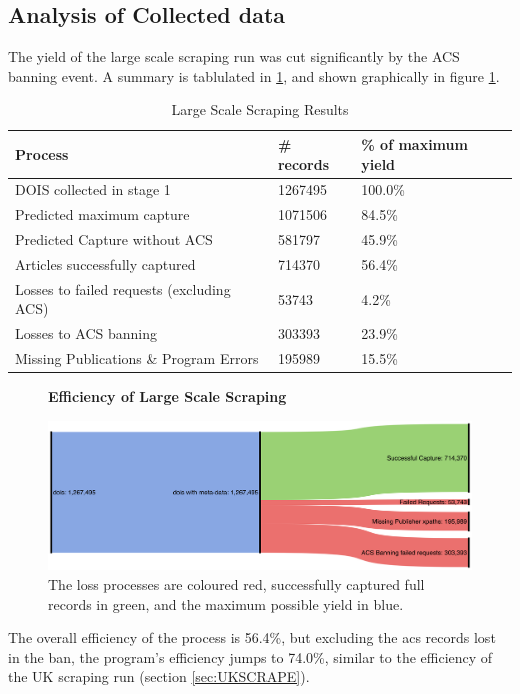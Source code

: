 \subsection{Analysis of Collected data}
The yield of the large scale scraping run was cut significantly by the ACS banning event. A summary is tablulated in \ref{tab:LARGESCRAPERES}, and shown graphically in figure \ref{fig:LARGESANK}.
\begin{table}[h!]
\label{tab:LARGESCRAPERES}
\caption{Large Scale Scraping Results}
\begin{center}
\begin{tabular}{||l|l|l||}
\hline
Process & \# records & \% of maximum yield\\
\hline
DOIS collected in stage 1 &  1267495 &100.0\%\\
\hline
Predicted maximum capture & 1071506 &  84.5\%\\
Predicted Capture without ACS & 581797 & 45.9\%\\
\hline
Articles successfully captured & 714370 & 56.4\%\\
Losses to failed requests (excluding ACS)& 53743 & 4.2\%\\
Losses to ACS banning & 303393 & 23.9\%\\
Missing Publications \& Program Errors & 195989 & 15.5\%\\
\hline
\end{tabular}
\end{center}
\end{table}
\begin{figure}[H]
    \centering
    \textbf{Efficiency of Large Scale Scraping}\par\medskip
    \includegraphics[width=\textwidth]{Data_Acquisition/large_sankey.png}
    \caption{The loss processes are coloured red, successfully captured full records in green, and the maximum possible yield in blue.}
     \label{fig:LARGESANK}
\end{figure}

The overall efficiency of the process is 56.4\%, but excluding the acs records lost in the ban, the program's efficiency jumps to 74.0\%, similar to the efficiency of the UK scraping run (section \ref{sec:UKSCRAPE}). 

